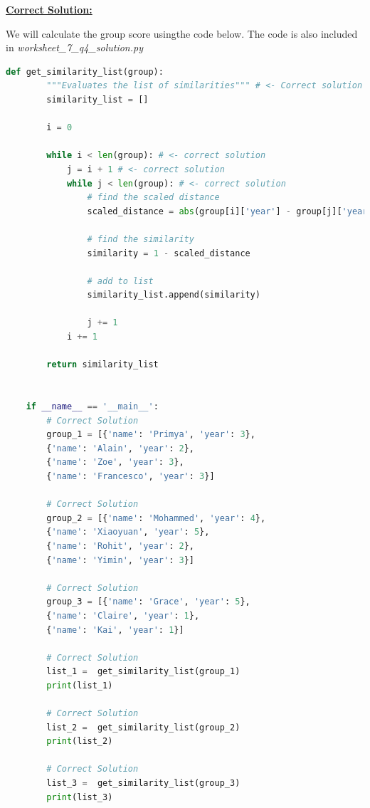 \documentclass[12pt]{article}
\begin{document}
\begin{mdframed}
    \underline{\textbf{Correct Solution:}}

    \bigskip

    We will calculate the group score \color{red}using\color{black}\:the code below. The code
    is also included in \textit{worksheet\_7\_q4\_solution.py}

    \bigskip

    \begin{lstlisting}[language=Python]
    def get_similarity_list(group):
        """Evaluates the list of similarities""" # <- Correct solution
        similarity_list = []

        i = 0

        while i < len(group): # <- correct solution
            j = i + 1 # <- correct solution
            while j < len(group): # <- correct solution
                # find the scaled distance
                scaled_distance = abs(group[i]['year'] - group[j]['year']) / 5.0 # <- correct solution

                # find the similarity
                similarity = 1 - scaled_distance

                # add to list
                similarity_list.append(similarity)

                j += 1
            i += 1

        return similarity_list


    if __name__ == '__main__':
        # Correct Solution
        group_1 = [{'name': 'Primya', 'year': 3},
        {'name': 'Alain', 'year': 2},
        {'name': 'Zoe', 'year': 3},
        {'name': 'Francesco', 'year': 3}]

        # Correct Solution
        group_2 = [{'name': 'Mohammed', 'year': 4},
        {'name': 'Xiaoyuan', 'year': 5},
        {'name': 'Rohit', 'year': 2},
        {'name': 'Yimin', 'year': 3}]

        # Correct Solution
        group_3 = [{'name': 'Grace', 'year': 5},
        {'name': 'Claire', 'year': 1},
        {'name': 'Kai', 'year': 1}]

        # Correct Solution
        list_1 =  get_similarity_list(group_1)
        print(list_1)

        # Correct Solution
        list_2 =  get_similarity_list(group_2)
        print(list_2)

        # Correct Solution
        list_3 =  get_similarity_list(group_3)
        print(list_3)


\end{lstlisting}
\end{mdframed}
\end{document}
